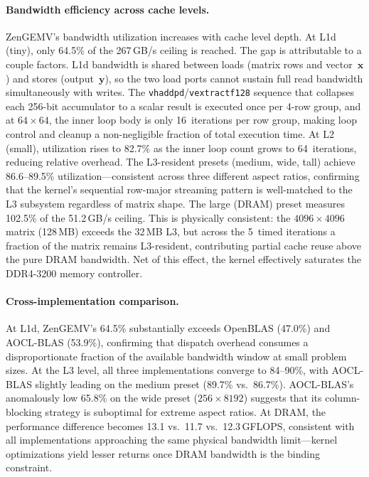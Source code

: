 \documentclass[runningheads]{llncs}
\begin{document}
\paragraph{Bandwidth efficiency across cache levels.}
ZenGEMV's bandwidth utilization increases with cache level depth.
At L1d (tiny), only 64.5\% of the 267\,GB/s ceiling is reached.
The gap is attributable to a couple factors. L1d bandwidth is shared
between loads (matrix rows and vector~$\mathbf{x}$) and stores
(output~$\mathbf{y}$), so the two load ports cannot sustain full read
bandwidth simultaneously with writes.
The \texttt{vhaddpd}/\texttt{vextractf128} sequence that
collapses each 256-bit accumulator to a scalar result is executed once
per 4-row group, and at $64\times64$, the inner loop body is only
16~iterations per row group, making loop control and cleanup a
non-negligible fraction of total execution time.
At L2 (small), utilization rises to 82.7\% as the inner loop count
grows to 64~iterations, reducing relative overhead.
The L3-resident presets (medium, wide, tall) achieve 86.6--89.5\%
utilization---consistent across three different aspect ratios, confirming
that the kernel's sequential row-major streaming pattern is well-matched
to the L3 subsystem regardless of matrix shape.
The large (DRAM) preset measures 102.5\% of the 51.2\,GB/s ceiling.
This is physically consistent: the $4096\times4096$ matrix (128\,MB)
exceeds the 32\,MB L3, but across the 5~timed iterations a fraction of
the matrix remains L3-resident, contributing partial cache reuse above
the pure DRAM bandwidth. Net of this effect, the kernel effectively
saturates the DDR4-3200 memory controller.

\paragraph{Cross-implementation comparison.}
At L1d, ZenGEMV's 64.5\% substantially exceeds OpenBLAS (47.0\%) and
AOCL-BLAS (53.9\%), confirming that dispatch overhead consumes a
disproportionate fraction of the available bandwidth window at small
problem sizes. At the L3 level, all three implementations converge to
84--90\%, with AOCL-BLAS slightly leading on the medium preset
(89.7\% vs.\ 86.7\%).
AOCL-BLAS's anomalously low 65.8\% on the wide preset
($256\times8192$) suggests that its column-blocking strategy is
suboptimal for extreme aspect ratios.
At DRAM, the performance difference becomes 13.1 vs.\ 11.7 vs.\
12.3\,GFLOPS, consistent with all implementations approaching the same
physical bandwidth limit---kernel optimizations yield lesser returns
once DRAM bandwidth is the binding constraint.
\end{document}

